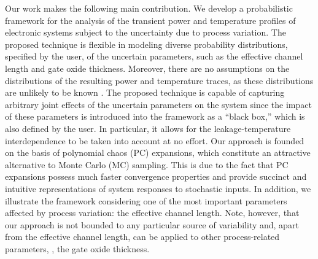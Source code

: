
Our work makes the following main contribution.
We develop a probabilistic framework for the analysis of the transient power and temperature profiles of electronic systems subject to the uncertainty due to process variation.
The proposed technique is flexible in modeling diverse probability distributions, specified by the user, of the uncertain parameters, such as the effective channel length and gate oxide thickness.
Moreover, there are no assumptions on the distributions of the resulting power and temperature traces, as these distributions are unlikely to be known \apriori.
The proposed technique is capable of capturing arbitrary joint effects of the uncertain parameters on the system since the impact of these parameters is introduced into the framework as a ``black box,'' which is also defined by the user.
In particular, it allows for the leakage-temperature interdependence to be taken into account at no effort.
Our approach is founded on the basis of polynomial chaos (PC) expansions, which constitute an attractive alternative to Monte Carlo (MC) sampling.
This is due to the fact that PC expansions possess much faster convergence properties and provide succinct and intuitive representations of system responses to stochastic inputs.
In addition, we illustrate the framework considering one of the most important parameters affected by process variation: the effective channel length.
Note, however, that our approach is not bounded to any particular source of variability and, apart from the effective channel length, can be applied to other process-related parameters, \eg, the gate oxide thickness.
